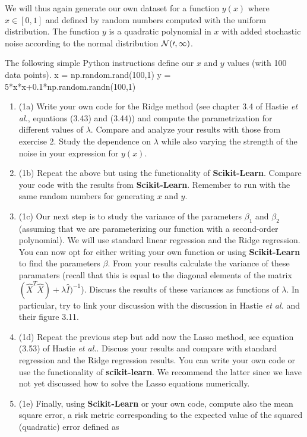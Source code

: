 \documentclass[%
oneside,                 %
final,                   %
10pt]{article}
\begin{document}
We will thus again generate our own dataset for a function $y(x)$ where 
$x \in [0,1]$ and defined by random numbers computed with the uniform
distribution. The function $y$ is a quadratic polynomial in $x$ with
added stochastic noise according to the normal distribution $\cal{N}(0,1)$.

The following simple Python instructions define our $x$ and $y$ values (with 100 data points).
\bpycod
x = np.random.rand(100,1)
y = 5*x*x+0.1*np.random.randn(100,1)
\epycod

\begin{enumerate}
\item (1a) Write your own code for the Ridge method (see chapter 3.4 of Hastie \emph{et al.}, equations (3.43) and (3.44)) and compute the parametrization for different values of $\lambda$. Compare and analyze your results with those from exercise 2. Study the dependence on $\lambda$ while also varying the strength of the noise in your expression for $y(x)$. 

\item (1b) Repeat the above but using the functionality of \textbf{Scikit-Learn}. Compare your code with the results from \textbf{Scikit-Learn}. Remember to run with the same random numbers for generating $x$ and $y$. 

\item (1c) Our next step is to study the variance of the parameters $\beta_1$ and $\beta_2$ (assuming that we are parameterizing our function with a second-order polynomial). We will use standard linear regression and the Ridge regression.  You can now opt for either writing your own function or using \textbf{Scikit-Learn} to find the parameters $\beta$. From your results calculate the variance of these paramaters (recall that this is equal to the diagonal elements of the matrix $(\hat{X}^T\hat{X})+\lambda\hat{I})^{-1}$). Discuss the results of these variances as functions of $\lambda$. In particular, try to link your discussion with the discussion in Hastie \emph{et al.} and their figure 3.11.

\item (1d) Repeat the previous step but add now the Lasso method, see equation (3.53) of Hastie \emph{et al.}. Discuss your results and compare with standard regression and the Ridge regression results. You can write your own code or use the functionality of \textbf{scikit-learn}.  We recommend the latter since we have not yet discussed how to solve the Lasso equations numerically.

\item (1e) Finally, using \textbf{Scikit-Learn} or your own code, compute also the mean square error, a risk metric corresponding to the expected value of the squared (quadratic) error defined as
\end{enumerate}
\end{document}
